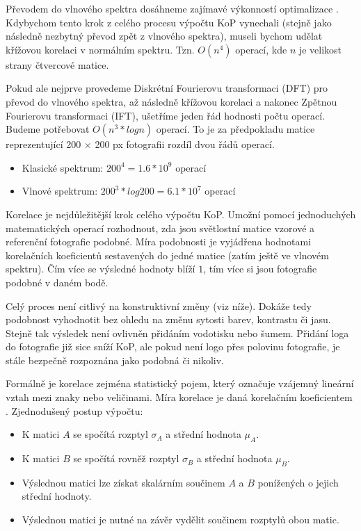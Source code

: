 Převodem do vlnového spektra dosáhneme zajímavé výkonností optimalizace \cite{FFT}. Kdybychom tento krok z celého procesu výpočtu KoP vynechali (stejně jako následně nezbytný převod zpět z vlnového spektra), museli bychom udělat křížovou korelaci v normálním spektru. Tzn. $ O(n^4) $ operací, kde $ n $ je velikost strany čtvercové matice.

Pokud ale nejprve provedeme Diskrétní Fourierovu transformaci (DFT) pro převod do vlnového spektra, až následně křížovou korelaci a nakonec Zpětnou Fourierovu transformaci (IFT), ušetříme jeden řád hodnosti počtu operací. Budeme potřebovat $ O(n^3 * logn) $ operací. To je za předpokladu matice reprezentující 200 × 200 px fotografii rozdíl dvou řádů operací.
\begin{itemize}
	\setlength{\parskip}{0pt}
	\setlength{\itemsep}{0pt}
	\item{Klasické spektrum: $ 200^4 = 1.6 * 10^9 $ operací}
	\item{Vlnové spektrum: $ 200^3 * log 200 = 6.1 * 10^7 $ operací}
\end{itemize}

Korelace je nejdůležitější krok celého výpočtu KoP. Umožní pomocí jednoduchých matematických operací rozhodnout, zda jsou světlostní matice vzorové a referenční fotografie podobné. Míra podobnosti je vyjádřena hodnotami korelačních koeficientů sestavených do jedné matice (zatím ještě ve vlnovém spektru). Čím více se výsledné hodnoty blíží $ 1 $, tím více si jsou fotografie podobné v daném bodě.

Celý proces není citlivý na konstruktivní změny (viz níže). Dokáže tedy podobnost vyhodnotit bez ohledu na změnu sytosti barev, kontrastu či jasu. Stejně tak výsledek není ovlivněn přidáním vodotisku nebo šumem. Přidání loga do fotografie již sice sníží KoP, ale pokud není logo přes polovinu fotografie, je stále bezpečně rozpoznána jako podobná či nikoliv.

Formálně je korelace zejména statistický pojem, který označuje vzájemný lineární vztah mezi znaky nebo veličinami. Míra korelace je daná korelačním koeficientem \cite{correlation}. Zjednodušený postup výpočtu:
\begin{itemize}
	\setlength{\parskip}{0pt}
	\setlength{\itemsep}{0pt}
	\item{K matici $ A $ se spočítá rozptyl $ \sigma_{A} $ a střední hodnota $ \mu_{A} $.}
	\item{K matici $ B $ se spočítá rovněž rozptyl $ \sigma_{B} $ a střední hodnota $ \mu_{B} $.}
	\item{Výslednou matici lze získat skalárním součinem $ A $ a $ B $ ponížených o jejich střední hodnoty.}
	\item{Výslednou matici je nutné na závěr vydělit součinem rozptylů obou matic.}
\end{itemize}

